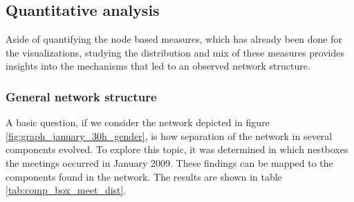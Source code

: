 \clearpage

\subsection{Quantitative analysis}
\label{subsec:quantitative_analysis}

Aside of quantifying the node based measures, which has already been done for the visualizations, studying the distribution and mix of these measures provides insights into the mechanisms that led to an observed network structure.  

\subsubsection{General network structure}
\label{subsubsec:general_structure}

A basic question, if we consider the network depicted in figure \ref{fig:graph_january_30h_gender}, is how separation of the network in several components evolved. To explore this topic, it was determined in which nestboxes the meetings occurred in January 2009. These findings can be mapped to the components found in the network. The results are shown in table \ref{tab:comp_box_meet_dist}.

